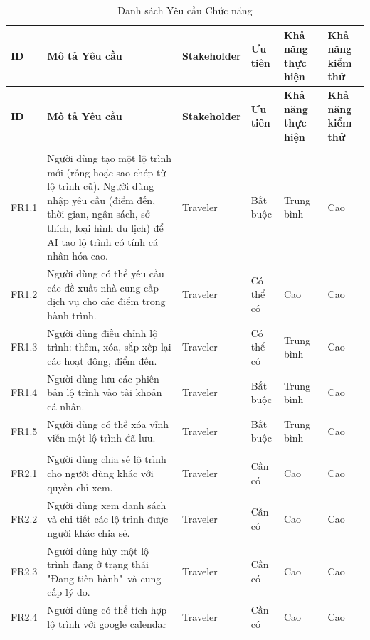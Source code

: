 \setlength\LTleft{\fill}
\setlength\LTright{\fill}
\renewcommand{\arraystretch}{1.2}

\begin{longtable}{p{1.7cm} p{5.8cm} p{2.3cm} p{1.8cm} p{1.8cm} p{1.8cm}}
\caption{Danh sách Yêu cầu Chức năng}\label{tab:functional}\\
\toprule
\textbf{ID} & \textbf{Mô tả Yêu cầu} & \textbf{Stakeholder} & \textbf{Ưu tiên} & \textbf{Khả năng thực hiện} & \textbf{Khả năng kiểm thử} \\
\midrule
\endfirsthead
\toprule
\textbf{ID} & \textbf{Mô tả Yêu cầu} & \textbf{Stakeholder} & \textbf{Ưu tiên} & \textbf{Khả năng thực hiện} & \textbf{Khả năng kiểm thử} \\
\midrule
\endhead
\midrule
\endfoot
\bottomrule
\endlastfoot

\multicolumn{6}{l}{\textbf{Module 1: Gợi ý lộ trình}}\\[2pt]
FR1.1 & Người dùng tạo một lộ trình mới (rỗng hoặc sao chép từ lộ trình cũ). Người dùng nhập yêu cầu (điểm đến, thời gian, ngân sách, sở thích, loại hình du lịch) để AI tạo lộ trình có tính cá nhân hóa cao.& Traveler  & Bắt buộc & Trung bình & Cao \\
FR1.2 & Người dùng có thể yêu cầu các đề xuất nhà cung cấp dịch vụ cho các điểm trong hành trình. & Traveler &  Có thể có & Cao & Cao \\
FR1.3 & Người dùng điều chỉnh lộ trình: thêm, xóa, sắp xếp lại các hoạt động, điểm đến. & Traveler & Có thể có & Trung bình & Cao \\
FR1.4 & Người dùng lưu các phiên bản lộ trình vào tài khoản cá nhân. & Traveler & Bắt buộc & Trung bình & Cao \\
FR1.5 & Người dùng có thể xóa vĩnh viễn một lộ trình đã lưu. & Traveler & Bắt buộc & Trung bình & Cao \\

\addlinespace
\multicolumn{6}{l}{\textbf{Module 2: Quản lý lộ trình}}\\[2pt]
FR2.1 & Người dùng chia sẻ lộ trình cho người dùng khác với quyền chỉ xem. & Traveler & Cần có & Cao & Cao \\
FR2.2 & Người dùng xem danh sách và chi tiết các lộ trình được người khác chia sẻ. & Traveler & Cần có & Cao & Cao \\
FR2.3 & Người dùng hủy một lộ trình đang ở trạng thái "Đang tiến hành"\ và cung cấp lý do. & Traveler & Cần có & Cao & Cao \\
FR2.4 & Người dùng có thể tích hợp lộ trình với google calendar & Traveler & Cần có & Cao & Cao \\


\end{longtable}
